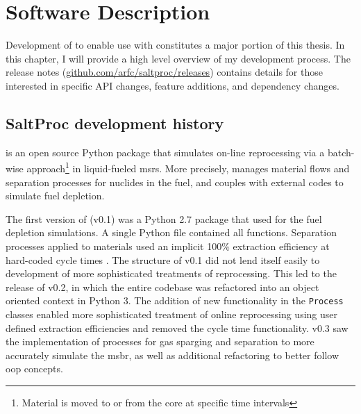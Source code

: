 \chapter{Software Description}
\label{ch:chapter3}
\glsresetall
Development of \SaltProc to enable use with \OpenMC constitutes a major portion
of this thesis. In this chapter, I will provide a high level overview
of my development process. The release
notes (\url{github.com/arfc/saltproc/releases}) contains
details for those interested in specific API changes, feature additions,
and dependency changes. 

\section{SaltProc development history}%
\label{sec:saltproc-history}

\SaltProc\cite{rykhlevskii_saltproc_2018} is an open source Python package that
simulates on-line reprocessing via a batch-wise approach\footnote{Material is
moved to or from the core at specific time intervals} in liquid-fueled
\Gls{msr}s. More precisely, \SaltProc manages material flows and separation
processes for nuclides in the fuel, and couples with external codes to simulate
fuel depletion.

The first version of \SaltProc (v0.1) was a Python 2.7 package that used
\SerpentTWO for the fuel depletion simulations. A single Python file contained
all functions. Separation processes applied to materials used an implicit 100\%
extraction efficiency at hard-coded cycle times \cite{rykhlevskii_advanced_2018}.
The structure of \SaltProc v0.1 did not lend itself easily to development of more
sophisticated treatments of reprocessing. This led to the release of \SaltProc
v0.2, in which the entire codebase was refactored into an object oriented
context in Python 3. The addition of new functionality in the \verb.Process.
classes enabled more sophisticated treatment of online reprocessing using user
defined extraction efficiencies and removed the cycle time functionality\cite{rykhlevskii_fuel_2020}.
\SaltProc v0.3 saw the implementation of processes for gas sparging and
separation to more accurately simulate the \gls{msbr}, as well as additional
refactoring to better follow \gls{oop} concepts.

